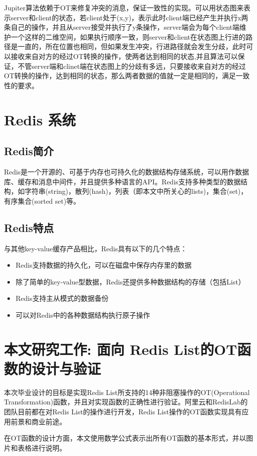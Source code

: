 Jupiter算法依赖于OT来修复冲突的消息，保证一致性的实现。可以用状态图来表示server和client的状态，若client处于(x,y)，表示此时client端已经产生并执行x两条自己的操作，并且从server接受并执行了y条操作，server端会为每个client端维护一个这样的二维空间，如果执行顺序一致，则server和client在状态图上行进的路径是一直的，所在位置也相同，但如果发生冲突，行进路径就会发生分歧，此时可以接收来自对方的经过OT转换的操作，使两者达到相同的状态,并且算法可以保证，不管server端和clinet端在状态图上的分歧有多远，只要接收来自对方的经过OT转换的操作，达到相同的状态，那么两者数据的值就一定是相同的，满足一致性的要求。

\section{Redis 系统}
\subsection{Redis简介}
Redis是一个开源的、可基于内存也可持久化的数据结构存储系统，可以用作数据库、缓存和消息中间件，并且提供多种语言的API。Redis支持多种类型的数据结构，如字符串(string)，散列(hash)，列表（即本文中所关心的lists)，集合(set)，有序集合(sorted set)等。
\subsection{Redis特点}
与其他key-value缓存产品相比，Redis具有以下的几个特点：
\begin{itemize}
\item Redis支持数据的持久化，可以在磁盘中保存内存里的数据
\item 除了简单的key-value型数据，Redis还提供多种数据结构的存储（包括List）
\item Redis支持主从模式的数据备份
\item 可以对Redis中的各种数据结构执行原子操作
\end{itemize}
\section{本文研究工作: 面向 Redis List的OT函数的设计与验证}
	\par 本次毕业设计的目标是实现Redis List所支持的14种非阻塞操作的OT(Operational Transformation)函数，并且对实现函数的正确性进行验证。阿里云和RedisLab的团队目前都在对Redis List的操作进行开发，Redis List操作的OT函数实现具有应用前景和商业前途。

	\par 在OT函数的设计方面，本文使用数学公式表示出所有OT函数的基本形式，并以图片和表格进行说明。

